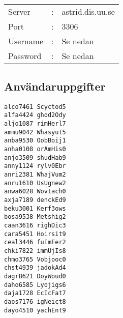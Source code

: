 \documentclass{article}
\begin{document}
  \paragraph{}
    \begin{tabular}{l c l}
    Server & : & astrid.dis.uu.se \\
    Port & : & 3306 \\
    Username & : & Se nedan \\
    Password & : & Se nedan \\
    \end{tabular}

  \subsection*{Användaruppgifter}
    \texttt{alco7461 Scyctod5} \\
    \texttt{alfa4424 ghod2Ody} \\
    \texttt{aljo1087 rimHerl7} \\
    \texttt{ammu9042 Whasyut5} \\
    \texttt{anba9530 OobBoij1} \\
    \texttt{anha0108 orAmHis0} \\
    \texttt{anjo3509 shudHab9} \\
    \texttt{anny1124 rylv0Ebr} \\
    \texttt{anri2381 WhajVum2} \\
    \texttt{anru1610 UsUgnew2} \\
    \texttt{anwa6028 Wovtach0} \\
    \texttt{axja7189 denckEd9} \\
    \texttt{beku3001 Kerf3ows} \\
    \texttt{bosa9538 Metshig2} \\
    \texttt{caan3616 righDic3} \\
    \texttt{cara5451 Hoirsit9} \\
    \texttt{ceal3446 fuImFer2} \\
    \texttt{chki7822 immUjIs8} \\
    \texttt{chmo3765 Vobjooc0} \\
    \texttt{chst4939 jadokAd4} \\
    \texttt{dagr8621 DoyWoud0} \\
    \texttt{daho6585 Lyojigs6} \\
    \texttt{daja1728 EcIcFat7} \\
    \texttt{daos7176 igNeict8} \\
    \texttt{dayo4510 yachEnt9} \\
\end{document}
